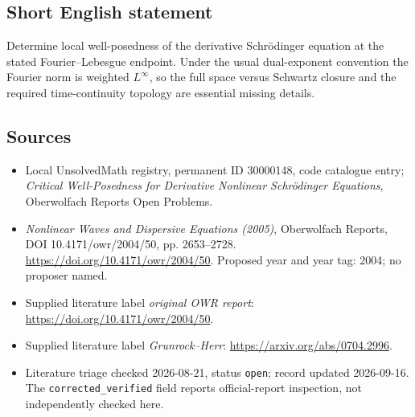 \documentclass[11pt]{article}
\begin{document}
\subsection{Short English statement}
Determine local well-posedness of the derivative Schr\"odinger equation at the stated Fourier--Lebesgue endpoint. Under the usual dual-exponent convention the Fourier norm is weighted \(L^\infty\), so the full space versus Schwartz closure and the required time-continuity topology are essential missing details.
\subsection{Sources}
\begin{itemize}\item Local UnsolvedMath registry, permanent ID 30000148, code catalogue entry; \emph{Critical Well-Posedness for Derivative Nonlinear Schr\"odinger Equations}, Oberwolfach Reports Open Problems.\item \emph{Nonlinear Waves and Dispersive Equations (2005)}, Oberwolfach Reports, DOI 10.4171/owr/2004/50, pp. 2653--2728. \url{https://doi.org/10.4171/owr/2004/50}. Proposed year and year tag: 2004; no proposer named.\item Supplied literature label \emph{original OWR report}: \url{https://doi.org/10.4171/owr/2004/50}.\item Supplied literature label \emph{Grunrock--Herr}: \url{https://arxiv.org/abs/0704.2996}.\item Literature triage checked 2026-08-21, status \texttt{open}; record updated 2026-09-16. The \texttt{corrected\_verified} field reports official-report inspection, not independently checked here.\end{itemize}
\end{document}
